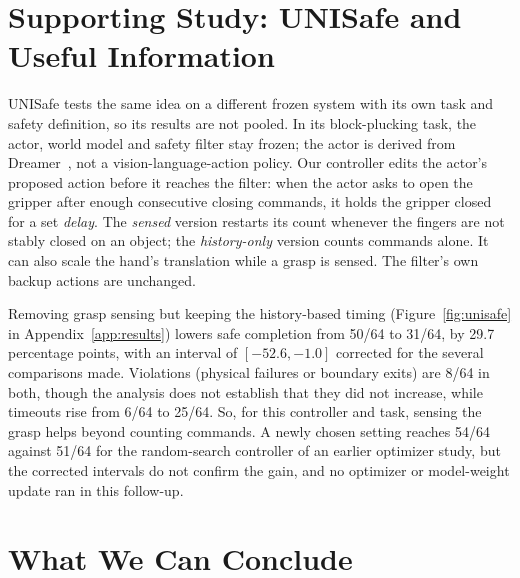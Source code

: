 \documentclass[sigconf,nonacm]{acmart}
\begin{document}


\section{Supporting Study: UNISafe and Useful Information}\label{sec:unisafe}
UNISafe tests the same idea on a different frozen system with its own task
and safety definition, so its results are not pooled. In its block-plucking task, the actor, world model and
safety filter stay frozen; the actor is derived from
Dreamer~\cite{hafner2025dreamerv3}, not a vision-language-action policy. Our
controller edits the actor's proposed action before it reaches the filter:
when the actor asks to open the gripper after enough consecutive closing
commands, it holds the gripper closed for a set \emph{delay}. The
\emph{sensed} version restarts its count whenever the fingers are not stably
closed on an object; the \emph{history-only} version counts commands alone.
It can also scale the hand's translation while a grasp is sensed. The
filter's own backup actions are unchanged.

Removing grasp sensing but keeping the history-based timing
(Figure~\ref{fig:unisafe} in Appendix~\ref{app:results}) lowers safe
completion from 50/64 to 31/64, by 29.7 percentage points, with an interval
of $[-52.6,-1.0]$ corrected for the several comparisons made. Violations
(physical failures or boundary exits) are 8/64 in both, though the analysis
does not establish that they did not increase, while timeouts rise from
6/64 to 25/64. So, for this controller and task, sensing the grasp helps
beyond counting commands. A newly
chosen setting reaches 54/64 against 51/64 for the random-search controller
of an earlier optimizer study, but the corrected intervals do not confirm
the gain, and no optimizer or model-weight update ran in this follow-up.

\section{What We Can Conclude}
\end{document}
